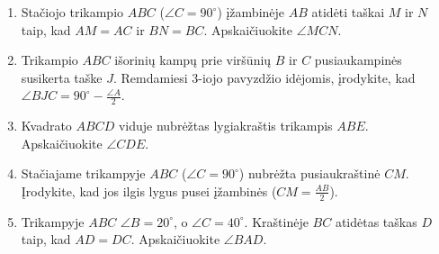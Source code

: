 \documentclass[11pt,a4paper]{scrartcl}
\begin{document}
\begin{enumerate}
\begin{center}
    \end{center}
    
    \item Stačiojo trikampio $ABC$ ($\angle C = 90^\circ$) įžambinėje $AB$ atidėti taškai $M$ ir $N$ taip, kad $AM = AC$ ir $BN = BC$. Apskaičiuokite $\angle MCN$.
    \item Trikampio $ABC$ išorinių kampų prie viršūnių $B$ ir $C$ pusiaukampinės susikerta taške $J$. Remdamiesi 3-iojo pavyzdžio idėjomis, įrodykite, kad $\angle BJC = 90^\circ - \frac{\angle A}{2}$.
    \item Kvadrato $ABCD$ viduje nubrėžtas lygiakraštis trikampis $ABE$. Apskaičiuokite $\angle CDE$.
    
    \item Stačiajame trikampyje $ABC$ ($\angle C = 90^\circ$) nubrėžta pusiaukraštinė $CM$. Įrodykite, kad jos ilgis lygus pusei įžambinės ($CM = \frac{AB}{2}$).
    \item Trikampyje $ABC$ $\angle B = 20^\circ$, o $\angle C = 40^\circ$. Kraštinėje $BC$ atidėtas taškas $D$ taip, kad $AD = DC$. Apskaičiuokite $\angle BAD$.
\end{enumerate}
\end{document}
